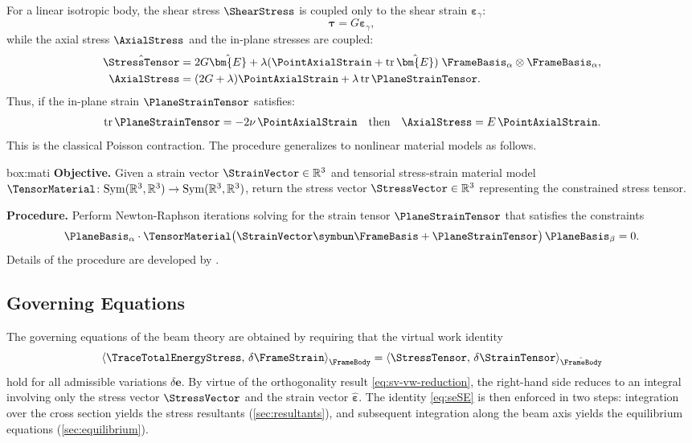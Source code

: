 For a linear isotropic body, the shear stress \(\ShearStress\) is coupled only to the shear strain \(\bm{\varepsilon}_{\gamma}\):
\[
\bm{\tau} = G\bm{\varepsilon}_{\gamma},
\]
while the axial stress \(\AxialStress\) and the in-plane stresses are coupled:
\[
\begin{aligned}
\hat{\StressTensor}
&= 2G \hat{\bm{E}}+\lambda (\PointAxialStrain + \operatorname{tr} \hat{\bm{E}}) \; \FrameBasis_{\alpha} \otimes \FrameBasis_{\alpha}, \\
\AxialStress
&=(2 G+\lambda) \PointAxialStrain+\lambda \operatorname{tr} \PlaneStrainTensor.
\end{aligned}
\]
Thus, if the in-plane strain \(\PlaneStrainTensor\) satisfies:
\begin{equation*}
\operatorname{tr}\PlaneStrainTensor = -2\nu\,\PointAxialStrain
\quad\text{then}\quad 
\AxialStress = E\,\PointAxialStrain.
\end{equation*}
This is the classical Poisson contraction. The procedure generalizes to nonlinear material models as follows.

\begin{ambox}{box:mati}
\textbf{Objective.} 
Given a strain vector \(\StrainVector \in \mathbb{R}^3\) and tensorial stress-strain material model \(\TensorMaterial \colon \mathrm{Sym}(\mathbb{R}^3, \mathbb{R}^3) \rightarrow \mathrm{Sym}(\mathbb{R}^3, \mathbb{R}^3)\), return the stress vector \(\StressVector \in \mathbb{R}^3\) representing the constrained stress tensor.

\textbf{Procedure.} 
Perform Newton-Raphson iterations solving for the strain tensor \({\PlaneStrainTensor}\) that satisfies the constraints
\[
\PlaneBasis_{\alpha}\cdot  \TensorMaterial\bigl(\StrainVector \symbun \FrameBasis + \PlaneStrainTensor \bigr)\, \PlaneBasis_{\beta} = 0.
\]
Details of the procedure are developed by \cite{klinkel2002using}.
\end{ambox}


\subsection{Governing Equations}\label{sec:governing-eqs}

The governing equations of the beam theory are obtained by requiring that the virtual work identity
\begin{equation}
\left<\TraceTotalEnergyStress,\,\delta\FrameStrain\right>_{\FrameBody}=\left<\StressTensor ,\,\delta\StrainTensor\right>_{\hat{\FrameBody}}
\label{eq:seSE}
\end{equation}
hold for all admissible variations \(\delta\bm{e}\). 
By virtue of the orthogonality result \eqref{eq:sv-vw-reduction}, the right-hand side reduces to an integral involving only the stress vector \(\StressVector\) and the strain vector \(\hat{\bm{\varepsilon}}\). 
The identity \eqref{eq:seSE} is then enforced in two steps: integration over the cross section yields the stress resultants (\cref{sec:resultants}), and subsequent integration along the beam axis yields the equilibrium equations (\cref{sec:equilibrium}).


